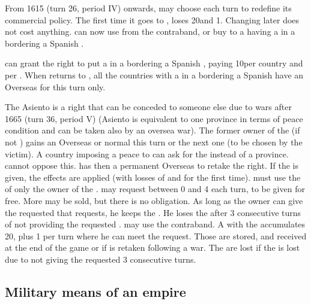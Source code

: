 \bparag From 1615 (turn 26, period IV) onwards, \SPA may choose each
turn to redefine its commercial policy. The first time it goes to
, \SPA loses 20\VP and 1\STAB. Changing later
does not cost anything.
\bparag \SPA can now use  from the contraband, or buy
 to a \MAJ having a \TradeFLEET in a \STZ bordering a
Spanish \COL.

\bparag \SPA can grant the right to put a \TradeFLEET in a \STZ
bordering a Spanish \COL, paying 10\VP per country and per \STZ.
\bparag When \SPA returns to , all the
countries with a \TradeFLEET in a \STZ bordering a Spanish \COL have an
Overseas \CB for this turn only.

 The Asiento is a right that can
be conceded to someone else due to wars after 1665 (turn 36, period V)
(Asiento is equivalent to one province in terms of peace condition and
can be taken also by an oversea war). The former owner of the
 (if not \SPA) gains an Overseas or normal \CB this turn
or the next one (to be chosen by the victim).
\bparag A country imposing a peace to \SPA can ask for the
 instead of a province. \SPA cannot oppose this. \SPA has
then a permanent Overseas \CB to retake the  right.
\bparag If the  is given, the 
effects are applied (with losses of \VP and \STAB for the first time).
\bparag \SPA must use the  of only the owner of the
. \SPA may request between 0 and 4  each
turn, to be given for free. More may be sold, but there is no
obligation. As long as the  owner can give the requested
 that \SPA requests, he keeps the . He loses
the  after 3 consecutive turns of not providing the
requested .
\bparag \SPA may use the  contraband.
 A \MAJ with the  accumulates
20\VP, plus 1 per turn where he can meet the  request. Those
\VP are stored, and received at the end of the game or if
 is retaken following a war. The \VP are lost if the
 is lost due to not giving the requested  3
consecutive turns.



\subsection{Military means of an empire}


